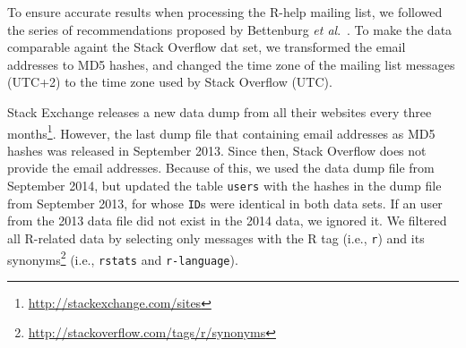 \documentclass{sig-alternate-05-2015}
\begin{document}


To ensure accurate results when processing the R-help mailing list, we followed the series of recommendations proposed by Bettenburg \textit{et al}.~\cite{Bettenburg2009}.
To make the data comparable againt the Stack Overflow dat set, we transformed the email addresses to MD5 hashes, and changed the time zone of the mailing list messages (UTC+2) to the time zone used by Stack Overflow (UTC).

Stack Exchange releases a new data dump from all their websites every three months\footnote{\url{http://stackexchange.com/sites}}.
However, the last dump file that containing email addresses as MD5 hashes was released in September 2013.
Since then, Stack Overflow does not provide the email addresses.
Because of this, we used the data dump file from September 2014, but updated the table \texttt{users} with the hashes in the dump file from September 2013, for whose \texttt{ID}s were identical in both data sets.
If an user from the 2013 data file did not exist in the 2014 data, we ignored it.
We filtered all R-related data by selecting only messages with the R tag (i.e., \texttt{r}) and its synonyms\footnote{\url{http://stackoverflow.com/tags/r/synonyms}} (i.e., \texttt{rstats} and \texttt{r-language}).

\end{document}

